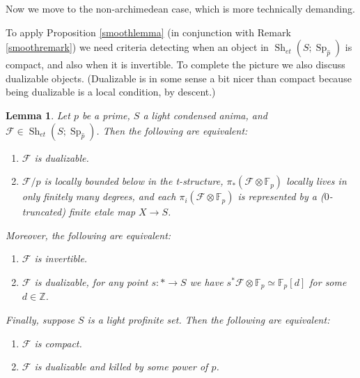 \documentclass[12pt]{article}
\newtheorem{lemma}[theorem]{Lemma}
\newcommand{\on}{\operatorname}
\newcommand{\mc}{\mathcal}
\newcommand{\mbb}{\mathbb}
\newcommand{\wh}{\widehat}
\begin{document}
Now we move to the non-archimedean case, which is more technically demanding.

To apply Proposition \ref{smoothlemma} (in conjunction with Remark \ref{smoothremark}) we need criteria detecting when an object in $\on{Sh}_{et}(S;\on{Sp}_{\wh{p}})$ is compact, and also when it is invertible.  To complete the picture we also discuss dualizable objects.  (Dualizable is in some sense a bit nicer than compact because being dualizable is a local condition, by descent.)

\begin{lemma}\label{compactinvertible}
Let $p$ be a prime, $S$ a light condensed anima, and $\mathcal{F}\in \on{Sh}_{et}(S;\on{Sp}_{\wh{p}})$.  Then the following are equivalent:
\begin{enumerate}
\item $\mathcal{F}$ is dualizable.
\item $\mathcal{F}/p$ is locally bounded below in the t-structure, $\pi_\ast (\mathcal{F}\otimes\mbb{F}_p)$ locally lives in only finitely many degrees, and each $\pi_i (\mathcal{F}\otimes\mbb{F}_p)$ is represented by a ($0$-truncated) finite etale map $X\to S$.
\end{enumerate}
Moreover, the following are equivalent:
\begin{enumerate}
\item $\mathcal{F}$ is invertible.
\item $\mathcal{F}$ is dualizable, for any point $s:\ast \to S$ we have $s^\ast\mc{F}\otimes\mbb{F}_p\simeq \mbb{F}_p[d]$ for some $d\in\mbb{Z}$.
\end{enumerate}
Finally, suppose $S$ is a light profinite set.  Then the following are equivalent:
\begin{enumerate}
\item $\mathcal{F}$ is compact.
\item $\mathcal{F}$ is dualizable and killed by some power of $p$.
\end{enumerate}
\end{lemma}
\end{document}
